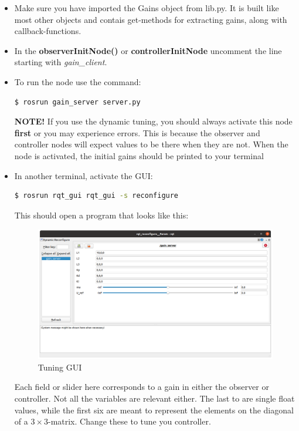 \documentclass{ol-softwaremanual}
\begin{document}
\begin{itemize}
    \item Make sure you have imported the Gains object from lib.py. It is built like most other objects and contais get-methods for extracting gains, along with callback-functions.
    \item In the \textbf{observerInitNode()} or \textbf{controllerInitNode} uncomment the line starting with \textit{gain\_client}.
    \item To run the node use the command:
    \begin{lstlisting}[language=bash,basicstyle=\mlttfamily, breaklines=true]
    $ rosrun gain_server server.py
    \end{lstlisting}
    \textbf{NOTE!} If you use the dynamic tuning, you should always activate this node \textbf{first} or you may experience errors. This is because the observer and controller nodes will expect values to be there when they are not. When the node is activated, the initial gains should be printed to your terminal
    \item In another terminal, activate the GUI: 
     \begin{lstlisting}[language=bash,basicstyle=\mlttfamily, breaklines=true]
    $ rosrun rqt_gui rqt_gui -s reconfigure
    \end{lstlisting}
    
    This should open a program that looks like this: 
    
    \begin{figure}[h]
        \centering
        \includegraphics[width=\textwidth]{dynamic-reconfigure.png}
        \caption{Tuning GUI}
        \label{fig:tuner}
    \end{figure}
    
    Each field or slider here corresponds to a gain in either the observer or controller. Not all the variables are relevant either. The last to are single float values, while the first six are meant to represent the elements on the diagonal of a $3\times3$-matrix. Change these to tune you controller. 
\end{itemize}
\end{document}

